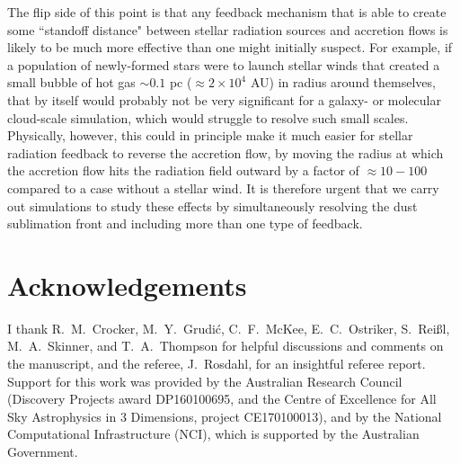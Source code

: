 \documentclass[useAMS,usenatbib]{mn2e}
\begin{document}
The flip side of this point is that any feedback mechanism that is able to create some ``standoff distance" between stellar radiation sources and accretion flows is likely to be much more effective than one might initially suspect. For example, if a population of newly-formed stars were to launch stellar winds that created a small bubble of hot gas $\sim 0.1$ pc ($\approx 2\times 10^4$ AU) in radius around themselves, that by itself would probably not be very significant for a galaxy- or molecular cloud-scale simulation, which would struggle to resolve such small scales. Physically, however, this could in principle make it much easier for stellar radiation feedback to reverse the accretion flow, by moving the radius at which the accretion flow hits the radiation field outward by a factor of $\approx 10-100$ compared to a case without a stellar wind. It is therefore urgent that we carry out simulations to study these effects by simultaneously resolving the dust sublimation front and including more than one type of feedback.


\section*{Acknowledgements}

I thank R.~M.~Crocker, M.~Y.~Grudi\'c, C.~F.~McKee, E.~C.~Ostriker, S.~Rei{\ss}l, M.~A.~Skinner, and T.~A.~Thompson for helpful discussions and comments on the manuscript, and the referee, J.~Rosdahl, for an insightful referee report. Support for this work was provided by the Australian Research Council (Discovery Projects award DP160100695, and the Centre of Excellence for All Sky Astrophysics in 3 Dimensions, project CE170100013), and by the National Computational Infrastructure (NCI), which is supported by the Australian Government.



\end{document}
